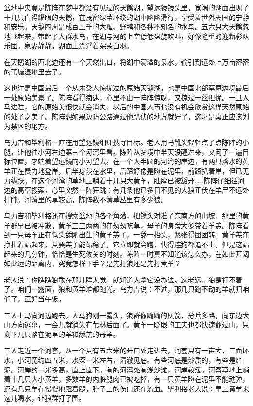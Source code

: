 \par 盆地中央竟是陈阵在梦中都没有见过的天鹅湖。望远镜镜头里，宽阔的湖面出现了十几只白得耀眼的天鹅，在茂密绿苇环绕的湖中幽幽滑行，享受着世外天国的宁静和安乐。天鹅四周是成百上千的大雁、野鸭和各种不知名的水鸟。五六只大天鹅忽地飞起来，带起了大群水鸟，在湖与河的上空低低盘旋欢叫，好像隆重的迎新彩队乐团。泉湖静静，湖面上漂浮着朵朵白羽。
\par 在天鹅湖的西北边还有一个天然出口，将湖中满溢的泉水，输引到远处上万亩密密的苇塘湿地里去了。
\par 这也许是中国最后一个从未受人惊扰过的原始天鹅湖，也是中国北部草原边境最后一处原始美景了。陈阵看得痴迷，心里不由一阵阵惊叹，又掠过一丝担忧。一旦人马进驻，它的原始美很快就会消失，以后的中国人再也没有机会欣赏这样天然原始的处子之美了。陈阵想如果边防公路通过他趴伏的地方就好了，这才是真正应该划为禁区的地方。
\par 
\par 乌力吉和毕利格一直在用望远镜细细搜寻目标。老人用马靴尖轻轻点了点陈阵的小腿，让他往小河右边第三个河湾里看。陈阵从梦境中半天没醒过来，又问了一遍目标位置，才端着望远镜向小河望去。在一个大半圆的河湾的岸边，有两只落水的黄羊正在费力地登岸，后半身浸在水里，后蹄好像是陷在泥里，前蹄扒着岸，但已无力纵跃。在这个河湾的草地上躺着十几只大黄羊，肚膛已被豁开……陈阵仔细往河边的高草搜索，心里突然一阵狂跳：有几条他已多日不见的大狼正伏在羊尸不远处打盹。河湾里的草较高，陈阵数不清草丛里有多少狼。
\par 乌力吉和毕利格还在搜索盆地的各个角落，把镜头对准了东南方的山坡，那里的黄羊群早已被冲散，黄羊三三两两的在匆匆吃草，母羊的身旁大多带着羊羔。陈阵看到一只母羊正在低头舔刚出生的黄羊羔子，一舔一抬头，紧张得团团转。黄羊羔在挣扎着站起来，只要羔子能站稳了，它立即就会跑，快得连狗都追不上。但是这站起来的几分钟，恰恰是生死攸关的时刻。陈阵一时真不知道该怎么办，在如此开阔如此远的距离内，究竟怎样下手？是先打狼还是先打黄羊？
\par 老人说：你瞧瞧狼敢在那儿睡大觉，就知道人拿它没办法。这老远，狼是打不着了。咱们一露面，狼和黄羊准都跑光。乌力吉说：不过，那几只跑不动的羊就归咱们了，正好当午饭。
\par 三人上马向河边跑去。人马狗刚一露头，狼群像飕飕的灰箭，分兵多路，向东边大山方向逃窜，一会儿就消失在苇林后面了。黄羊一眨眼的工夫也都快速翻过山，只剩下几只陷在泥里的羊和舔羔的母羊。
\par 三人走近一个河套，从一个只有五六米的开口处走进去，河套只有一亩大，三面环水，小河宽约四五米，水深一米左右，清澈见底。有些河底是沙质的，有些是烂泥。河岸约一米多高，直上直下。有的河湾处有浅沙滩，河岸较缓。河湾草地上躺着十几只大小黄羊，多数羊的内脏腿肉已被吃掉，有一只黄羊陷在泥里不能动弹，还有几只羊在慢慢地蹬着腿，脖子上的伤口还在流血。毕利格老人说：早上黄羊来这儿喝水，让狼群打了围。
